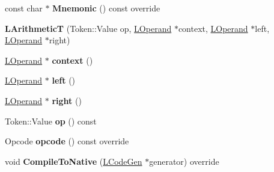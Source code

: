 \begin{DoxyCompactItemize}
\item 
const char $\ast$ {\bfseries Mnemonic} () const  override\hypertarget{classv8_1_1internal_1_1_l_arithmetic_t_a1b4e76dc60cc0615c54c3aad6a2d8c10}{}\label{classv8_1_1internal_1_1_l_arithmetic_t_a1b4e76dc60cc0615c54c3aad6a2d8c10}

\item 
{\bfseries L\+ArithmeticT} (Token\+::\+Value op, \hyperlink{classv8_1_1internal_1_1_l_operand}{L\+Operand} $\ast$context, \hyperlink{classv8_1_1internal_1_1_l_operand}{L\+Operand} $\ast$left, \hyperlink{classv8_1_1internal_1_1_l_operand}{L\+Operand} $\ast$right)\hypertarget{classv8_1_1internal_1_1_l_arithmetic_t_aed09089ca0bd6bd7614897b04b1d89d6}{}\label{classv8_1_1internal_1_1_l_arithmetic_t_aed09089ca0bd6bd7614897b04b1d89d6}

\item 
\hyperlink{classv8_1_1internal_1_1_l_operand}{L\+Operand} $\ast$ {\bfseries context} ()\hypertarget{classv8_1_1internal_1_1_l_arithmetic_t_ab306728ac49c78f6fe8eec0faafec98d}{}\label{classv8_1_1internal_1_1_l_arithmetic_t_ab306728ac49c78f6fe8eec0faafec98d}

\item 
\hyperlink{classv8_1_1internal_1_1_l_operand}{L\+Operand} $\ast$ {\bfseries left} ()\hypertarget{classv8_1_1internal_1_1_l_arithmetic_t_a62140bad6c260c92f8c86d7083874a9c}{}\label{classv8_1_1internal_1_1_l_arithmetic_t_a62140bad6c260c92f8c86d7083874a9c}

\item 
\hyperlink{classv8_1_1internal_1_1_l_operand}{L\+Operand} $\ast$ {\bfseries right} ()\hypertarget{classv8_1_1internal_1_1_l_arithmetic_t_ad65b8493527788115befa0634f9de1ae}{}\label{classv8_1_1internal_1_1_l_arithmetic_t_ad65b8493527788115befa0634f9de1ae}

\item 
Token\+::\+Value {\bfseries op} () const \hypertarget{classv8_1_1internal_1_1_l_arithmetic_t_ab6979d3ffa80748d912d58539cfe971c}{}\label{classv8_1_1internal_1_1_l_arithmetic_t_ab6979d3ffa80748d912d58539cfe971c}

\item 
Opcode {\bfseries opcode} () const  override\hypertarget{classv8_1_1internal_1_1_l_arithmetic_t_a8fb5ae23dc6ddac5a72adfe9028fb08d}{}\label{classv8_1_1internal_1_1_l_arithmetic_t_a8fb5ae23dc6ddac5a72adfe9028fb08d}

\item 
void {\bfseries Compile\+To\+Native} (\hyperlink{classv8_1_1internal_1_1_l_code_gen}{L\+Code\+Gen} $\ast$generator) override\hypertarget{classv8_1_1internal_1_1_l_arithmetic_t_a2ca63e96840eacc1494d0d39ebe782a5}{}\label{classv8_1_1internal_1_1_l_arithmetic_t_a2ca63e96840eacc1494d0d39ebe782a5}


\end{DoxyCompactItemize}
